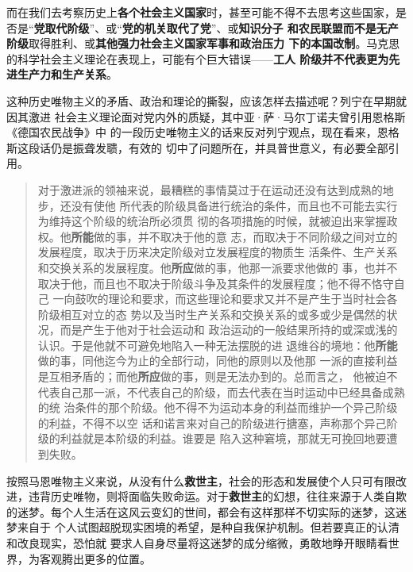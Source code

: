 而在我们去考察历史上\textbf{各个社会主义国家}时，甚至可能不得不去思考这些国家，是
否是``\textbf{党取代阶级}''、或``\textbf{党的机关取代了党}''、或\textbf{知识分子
  和农民联盟而不是无产阶级}取得胜利、或\textbf{其他强力社会主义国家军事和政治压力
  下的本国改制}。马克思的科学社会主义理论在表现上，可能有个巨大错误——\textbf{工人
  阶级并不代表更为先进生产力和生产关系}。

这种历史唯物主义的矛盾、政治和理论的撕裂，应该怎样去描述呢？列宁在早期就因其激进
社会主义理论面对党内外的质疑，其中亚·萨·马尔丁诺夫曾引用恩格斯《德国农民战争》中
的一段历史唯物主义的话来反对列宁观点，现在看来，恩格斯这段话仍是振聋发聩，有效的
切中了问题所在，并具普世意义，有必要全部引用。

\begin{quotation}
  对于激进派的领袖来说，最糟糕的事情莫过于在运动还没有达到成熟的地步，还没有使他
  所代表的阶级具备进行统治的条件，而且也不可能去实行为维持这个阶级的统治所必须贯
  彻的各项措施的时候，就被迫出来掌握政权。他\textbf{所能}做的事，并不取决于他的意
  志，而取决于不同阶级之间对立的发展程度，取决于历来决定阶级对立发展程度的物质生
  活条件、生产关系和交换关系的发展程度。他\textbf{所应}做的事，他那一派要求他做的
  事，也并不取决于他，而且也不取决于阶级斗争及其条件的发展程度；他不得不恪守自己
  一向鼓吹的理论和要求，而这些理论和要求又并不是产生于当时社会各阶级相互对立的态
  势以及当时生产关系和交换关系的或多或少是偶然的状况，而是产生于他对于社会运动和
  政治运动的一般结果所持的或深或浅的认识。于是他就不可避免地陷入一种无法摆脱的进
  退维谷的境地：他\textbf{所能}做的事，同他迄今为止的全部行动，同他的原则以及他那
  一派的直接利益是互相矛盾的；而他\textbf{所应}做的事，则是无法办到的。总而言之，
  他被迫不代表自己那一派，不代表自己的阶级，而去代表在当时运动中已经具备成熟的统
  治条件的那个阶级。他不得不为运动本身的利益而维护一个异己阶级的利益，不得不以空
  话和诺言来对自己的阶级进行搪塞，声称那个异己阶级的利益就是本阶级的利益。谁要是
  陷入这种窘境，那就无可挽回地要遭到失败。 
\end{quotation}

按照马恩唯物主义来说，从没有什么\textbf{救世主}，社会的形态和发展使个人只可有限改
进，违背历史唯物，则将面临失败命运。对于\textbf{救世主}的幻想，往往来源于人类自欺
的迷梦。每个人生活在这风云变幻的世间，都会有这样那样不切实际的迷梦，这迷梦来自于
个人试图超脱现实困境的希望，是种自我保护机制。但若要真正的认清和改良现实，恐怕就
要求人自身尽量将这迷梦的成分缩微，勇敢地睁开眼睛看世界，为客观腾出更多的位置。


